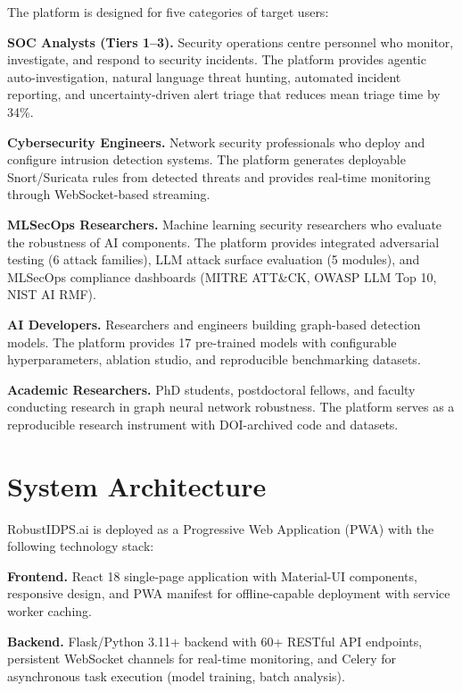 The platform is designed for five categories of target users:

\noindent\textbf{SOC Analysts (Tiers 1--3).} Security operations centre personnel who monitor, investigate, and respond to security incidents. The platform provides agentic auto-investigation, natural language threat hunting, automated incident reporting, and uncertainty-driven alert triage that reduces mean triage time by 34\%.

\noindent\textbf{Cybersecurity Engineers.} Network security professionals who deploy and configure intrusion detection systems. The platform generates deployable Snort/Suricata rules from detected threats and provides real-time monitoring through WebSocket-based streaming.

\noindent\textbf{MLSecOps Researchers.} Machine learning security researchers who evaluate the robustness of AI components. The platform provides integrated adversarial testing (6 attack families), LLM attack surface evaluation (5 modules), and MLSecOps compliance dashboards (MITRE ATT\&CK, OWASP LLM Top 10, NIST AI RMF).

\noindent\textbf{AI Developers.} Researchers and engineers building graph-based detection models. The platform provides 17 pre-trained models with configurable hyperparameters, ablation studio, and reproducible benchmarking datasets.

\noindent\textbf{Academic Researchers.} PhD students, postdoctoral fellows, and faculty conducting research in graph neural network robustness. The platform serves as a reproducible research instrument with DOI-archived code and datasets.


\section{System Architecture}
\label{sec:system_arch}

RobustIDPS.ai is deployed as a Progressive Web Application (PWA) with the following technology stack:

\noindent\textbf{Frontend.} React 18 single-page application with Material-UI components, responsive design, and PWA manifest for offline-capable deployment with service worker caching.

\noindent\textbf{Backend.} Flask/Python 3.11+ backend with 60+ RESTful API endpoints, persistent WebSocket channels for real-time monitoring, and Celery for asynchronous task execution (model training, batch analysis).

